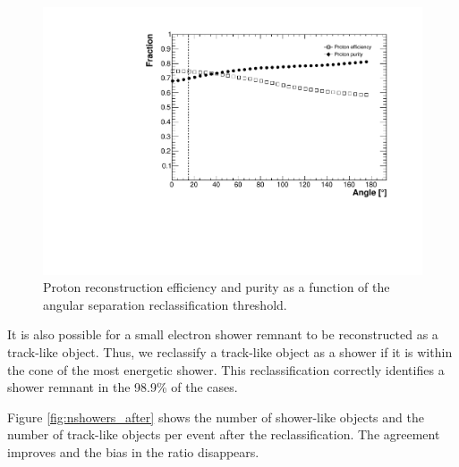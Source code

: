 \begin{figure}[htbp]
\centering
  \includegraphics[width=0.65\linewidth]{figures/proton_angle.pdf}
  \caption{Proton reconstruction efficiency and purity as a function of the angular separation reclassification threshold.}
  \label{fig:showerangle}
\end{figure}

It is also possible for a small electron shower remnant to be reconstructed as a track-like object. Thus, we reclassify a track-like object as a shower if it is within the cone of the most energetic shower. This reclassification correctly identifies a shower remnant in the 98.9\% of the cases.

Figure \ref{fig:nshowers_after} shows the number of shower-like objects and the number of track-like objects per event after the reclassification. The agreement improves and the bias in the ratio disappears. 

